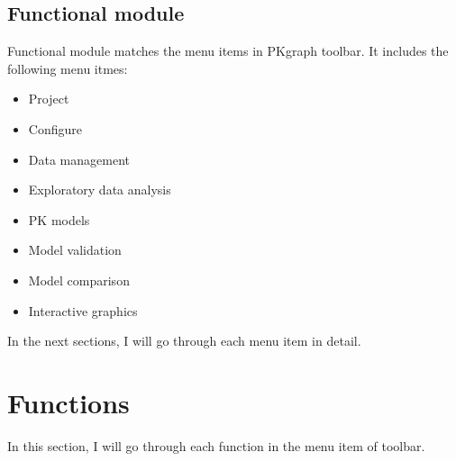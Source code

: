 \documentclass[a4paper]{article}
\begin{document}
\subsection{Functional module}
Functional module matches the menu items in PKgraph toolbar. It includes the following menu itmes: \newline
\begin{itemize}
	\item Project
	\item Configure
	\item Data management
	\item Exploratory data analysis
	\item PK models
	\item Model validation
	\item Model comparison
	\item Interactive graphics
\end{itemize}
In the next sections, I will go through each menu item in detail.
\section{Functions}
In this section, I will go through each function in the menu item of toolbar.
\end{document}
